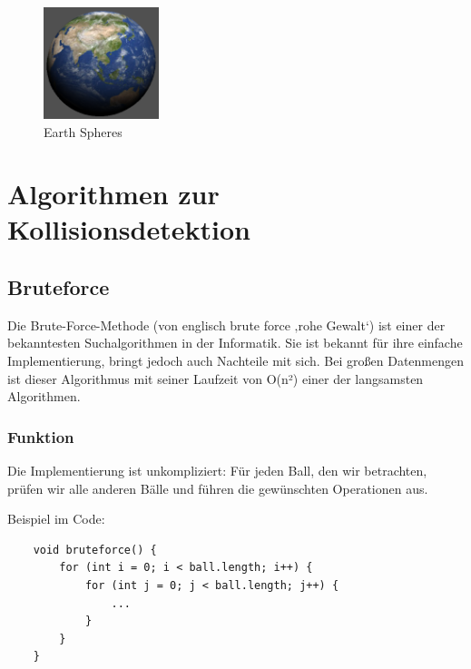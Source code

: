 \documentclass[12pt,a4paper]{article}
\begin{document}
				\begin{figure}[H]
			\centering 
			\includegraphics[width=0.3\textwidth]{../data/Sphere.png}  
			\caption{Earth Spheres} 
			\label{Bild: Earth Sphere}  
		\end{figure}
		
		

		
	
	\section{Algorithmen zur Kollisionsdetektion}
	
\subsection{Bruteforce}

Die Brute-Force-Methode (von englisch brute force ‚rohe Gewalt‘) \cite{Bruteforce} ist einer der bekanntesten Suchalgorithmen in der Informatik. Sie ist bekannt für ihre einfache Implementierung, bringt jedoch auch Nachteile mit sich. Bei großen Datenmengen ist dieser Algorithmus mit seiner Laufzeit von  O(n²) einer der langsamsten Algorithmen.

\subsubsection{Funktion}

Die Implementierung ist unkompliziert: Für jeden Ball, den wir betrachten, prüfen wir alle anderen Bälle und führen die gewünschten Operationen aus.

\vspace{0.5cm}
Beispiel im Code:

\begin{verbatim}
	void bruteforce() {
		for (int i = 0; i < ball.length; i++) {
			for (int j = 0; j < ball.length; j++) {
				...
			}
		}
	}
\end{verbatim}
	
	
	
	
	
	
	
\end{document}
